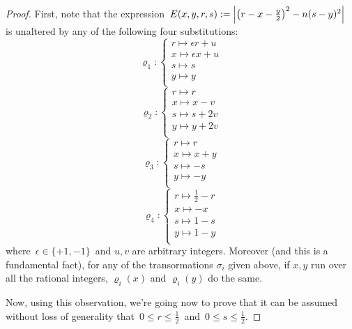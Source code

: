 \begin{proof}
First, note that the expression\, $E(x, y, r, s):=
\left| \left(r - x - \frac{y}{2}\right)^2 - n (s - y)^2 \right|$\,
is unaltered by any of the following four substitutions:
%
\begin{equation}
\varrho_1:
\left\{ \begin{array}{l}
r \mapsto \epsilon r + u  \\[4pt]
x \mapsto \epsilon x + u  \\[4pt]
s \mapsto s                 \\[4pt]
y \mapsto y                 \\[4pt]
\end{array}
\right.
\end{equation}
%
\begin{equation}
\varrho_2:
\left\{ \begin{array}{l}
r \mapsto r      \\[4pt]
x \mapsto x - v  \\[4pt]
s \mapsto s + 2v \\[4pt]
y \mapsto y + 2v \\[4pt]
\end{array}
\right.
\end{equation}
\begin{equation}
\varrho_3:
\left\{ \begin{array}{l}
r \mapsto r     \\[4pt]
x \mapsto x + y \\[4pt]
s \mapsto -s    \\[4pt]
y \mapsto -y    \\[4pt]
\end{array}
\right.
\end{equation}
\begin{equation}
\varrho_4:
\left\{ \begin{array}{l}
r \mapsto \frac{1}{2} - r \\[4pt]
x \mapsto -x              \\[4pt]
s \mapsto 1 - s           \\[4pt]
y \mapsto 1 - y           \\[4pt]
\end{array}
\right.
\end{equation}
%
where\, $\epsilon \in \{+1, -1\}$\, and $u,v$ are
arbitrary integers.
Moreover (and this is a fundamental fact), for any of the transormations
$\sigma_i$ given above, if $x,y$ run over all the rational integers,
${\varrho_i}(x)$ and ${\varrho_i}(y)$ do the same.

Now, using this observation, we're going now to prove that it
can be assumed without loss of generality that\,
$0 \leq r \leq \frac{1}{2}$\, and\,
$0 \leq s \leq \frac{1}{2}$.


\end{proof}
